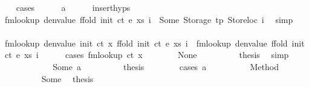 \begin{isabellebody}
\ \ \isamarkupfalse%
\ cases\isanewline
\ \ \ \ \isamarkupfalse%
\ a\isanewline
\ \ \ \ \isamarkupfalse%
\ insert{\isachardot}{\kern0pt}hyps{\isacharparenleft}{\kern0pt}{}{\isacharparenright}{\kern0pt}\ \isamarkupfalse%
\ {\isachardoublequoteopen}fmlookup\ {\isacharparenleft}{\kern0pt}denvalue\ {\isacharparenleft}{\kern0pt}ffold\ {\isacharparenleft}{\kern0pt}init\ ct{\isacharparenright}{\kern0pt}\ e\ xs{\isacharparenright}{\kern0pt}{\isacharparenright}{\kern0pt}\ i\ {\isacharequal}{\kern0pt}\ Some\ {\isacharparenleft}{\kern0pt}Storage\ tp{\isacharcomma}{\kern0pt}\ Storeloc\ i{\isacharparenright}{\kern0pt}{\isachardoublequoteclose}\ \isamarkupfalse%
\ simp\isanewline
\ \ \ \ \isamarkupfalse%
\ \isamarkupfalse%
\ {\isachardoublequoteopen}fmlookup\ {\isacharparenleft}{\kern0pt}denvalue\ {\isacharparenleft}{\kern0pt}init\ ct\ x\ {\isacharparenleft}{\kern0pt}ffold\ {\isacharparenleft}{\kern0pt}init\ ct{\isacharparenright}{\kern0pt}\ e\ xs{\isacharparenright}{\kern0pt}{\isacharparenright}{\kern0pt}{\isacharparenright}{\kern0pt}\ i\ {\isacharequal}{\kern0pt}\ fmlookup\ {\isacharparenleft}{\kern0pt}denvalue\ {\isacharparenleft}{\kern0pt}ffold\ {\isacharparenleft}{\kern0pt}init\ ct{\isacharparenright}{\kern0pt}\ e\ xs{\isacharparenright}{\kern0pt}{\isacharparenright}{\kern0pt}\ i{\isachardoublequoteclose}\isanewline
\ \ \ \ \isamarkupfalse%
\ {\isacharparenleft}{\kern0pt}cases\ {\isachardoublequoteopen}fmlookup\ ct\ x{\isachardoublequoteclose}{\isacharparenright}{\kern0pt}\isanewline
\ \ \ \ \ \ \isamarkupfalse%
\ None\isanewline
\ \ \ \ \ \ \isamarkupfalse%
\ \isamarkupfalse%
\ {\isacharquery}{\kern0pt}thesis\ \isamarkupfalse%
\ simp\isanewline
\ \ \ \ \isamarkupfalse%
\isanewline
\ \ \ \ \ \ \isamarkupfalse%
\ {\isacharparenleft}{\kern0pt}Some\ a{\isacharparenright}{\kern0pt}\isanewline
\ \ \ \ \ \ \isamarkupfalse%
\ \isamarkupfalse%
\ {\isacharquery}{\kern0pt}thesis\isanewline
\ \ \ \ \ \ \isamarkupfalse%
\ {\isacharparenleft}{\kern0pt}cases\ a{\isacharparenright}{\kern0pt}\isanewline
\ \ \ \ \ \ \ \ \isamarkupfalse%
\ {\isacharparenleft}{\kern0pt}Method\ {\isacharunderscore}{\kern0pt}{\isacharparenright}{\kern0pt}\isanewline
\ \ \ \ \ \ \ \ \isamarkupfalse%
\ Some\ \isamarkupfalse%
\ {\isacharquery}{\kern0pt}thesis\ \isamarkupfalse%

\end{isabellebody}
